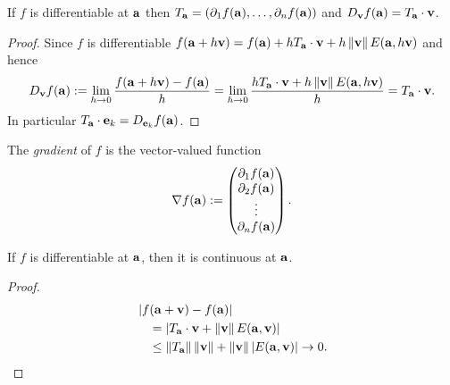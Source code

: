 \begin{theorem}
    If \(f\) is differentiable at \(\aa\)
    then \(T_\aa = \left( \partial_1 f(\aa), \ldots, \partial_nf(\aa) \right)\)
    and \(D_{\vv}f(\aa) = T_{\aa}\cdot \vv\).
\end{theorem}



\begin{proof}
    Since \(f\) is differentiable
    \(  f(\aa+ h \vv) = f(\aa) + h T_\aa \cdot \vv + h\norm{\vv}E(\aa,h\vv)\)
    and hence
    \[
        D_{\vv}f(\aa) :=
        \lim_{h\to 0} \frac{f(\aa+h \vv) - f(\aa)}{h}
        =
        \lim_{h\to 0} \frac{ h T_\aa \cdot \vv + h\norm{\vv}E(\aa,h\vv) }{h}
        = T_\aa \cdot \vv.
    \]
    In particular \(T_\aa\cdot \ee_k = D_{\ee_k}f(\aa)\).
\end{proof}





%
\begin{definition}[gradient]
    The \emph{gradient} of \(f\) is the vector-valued function
    \[
        \nabla f(\aa) :=
        \begin{pmatrix}
            \partial_1 f(\aa) \\
            \partial_2 f(\aa) \\
            \vdots            \\
            \partial_nf(\aa)
        \end{pmatrix}.
    \]
\end{definition}
%




\begin{theorem*}
    If \(f\) is differentiable at \(\aa\), then it is continuous at \(\aa\).
\end{theorem*}
\begin{proof}
    \begin{align*}
         & \abs{f(\aa+\vv)-f(\aa)}                                                            \\
         & \quad = \abs{ T_\aa \cdot \vv + \norm{\vv}E(\aa,\vv)  }                            \\
         & \quad \leq  \norm{T_\aa } \norm{\vv} + \norm{\vv} \abs{E(\aa,\vv)} \to 0. \qedhere
    \end{align*}
\end{proof}







